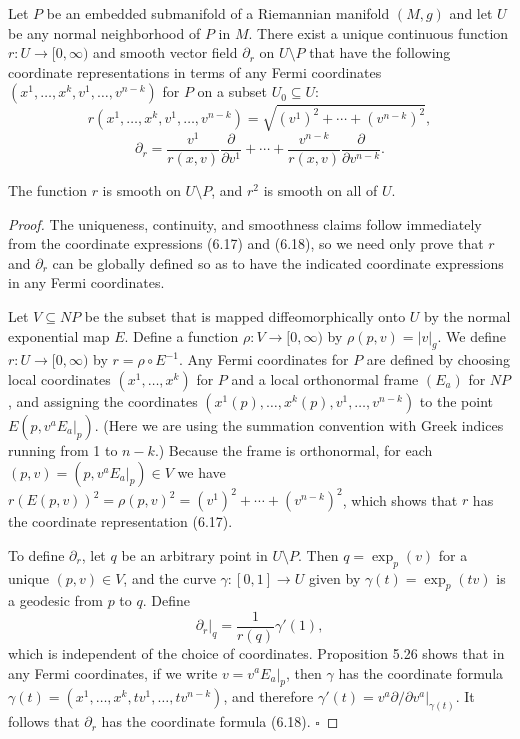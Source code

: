 \begin{proposition}
\label{prop:fermi-coordinates-radial-function}

Let $P$ be an embedded submanifold of a Riemannian manifold $(M,g)$ and let $U$ be any normal neighborhood of $P$ in $M$. There exist a unique continuous function $r : U \to [0,\infty)$ and smooth vector field $\partial_r$ on $U \setminus P$ that have the following coordinate representations in terms of any Fermi coordinates $(x^1,\ldots,x^k,v^1,\ldots,v^{n-k})$ for $P$ on a subset $U_0 \subseteq U$:
\begin{equation}
r(x^1,\ldots,x^k,v^1,\ldots,v^{n-k}) = \sqrt{(v^1)^2 + \cdots + (v^{n-k})^2}, \tag{6.17}
\end{equation}
\begin{equation}
\partial_r = \frac{v^1}{r(x,v)} \frac{\partial}{\partial v^1} + \cdots + \frac{v^{n-k}}{r(x,v)} \frac{\partial}{\partial v^{n-k}}. \tag{6.18}
\end{equation}

The function $r$ is smooth on $U \setminus P$, and $r^2$ is smooth on all of $U$.
\end{proposition}

\begin{proof}
The uniqueness, continuity, and smoothness claims follow immediately from the coordinate expressions (6.17) and (6.18), so we need only prove that $r$ and $\partial_r$ can be globally defined so as to have the indicated coordinate expressions in any Fermi coordinates.

Let $V \subseteq NP$ be the subset that is mapped diffeomorphically onto $U$ by the normal exponential map $E$. Define a function $\rho: V \to [0,\infty)$ by $\rho(p,v) = |v|_g$. We define $r: U \to [0,\infty)$ by $r = \rho \circ E^{-1}$. Any Fermi coordinates for $P$ are defined by choosing local coordinates $(x^1,\ldots,x^k)$ for $P$ and a local orthonormal frame $(E_a)$ for $NP$, and assigning the coordinates $(x^1(p),\ldots,x^k(p), v^1,\ldots,v^{n-k})$ to the point $E(p, v^a E_a|_p)$. (Here we are using the summation convention with Greek indices running from 1 to $n-k$.) Because the frame is orthonormal, for each $(p,v) = (p, v^a E_a|_p) \in V$ we have $r(E(p,v))^2 = \rho(p,v)^2 = (v^1)^2 + \cdots + (v^{n-k})^2$, which shows that $r$ has the coordinate representation (6.17).

To define $\partial_r$, let $q$ be an arbitrary point in $U \setminus P$. Then $q = \exp_p(v)$ for a unique $(p,v) \in V$, and the curve $\gamma: [0,1] \to U$ given by $\gamma(t) = \exp_p(tv)$ is a geodesic from $p$ to $q$. Define
\begin{equation}
\partial_r|_q = \frac{1}{r(q)}\gamma'(1), \tag{6.19}
\end{equation}
which is independent of the choice of coordinates. Proposition 5.26 shows that in any Fermi coordinates, if we write $v = v^a E_a|_p$, then $\gamma$ has the coordinate formula $\gamma(t) = (x^1,\ldots,x^k, tv^1,\ldots,tv^{n-k})$, and therefore $\gamma'(t) = v^a \partial/\partial v^a|_{\gamma(t)}$. It follows that $\partial_r$ has the coordinate formula (6.18). $\square$
\end{proof}

